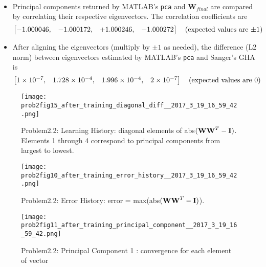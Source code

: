 \documentclass[epsfig]{article}
\begin{document}
\begin{itemize}
\begin{align*}
		\end{align*}
	\item  Principal components returned by MATLAB's \verb|pca| and  $\mathbf{W}_{final}$ are compared by correlating their respective eigenvectors.  The correlation coefficients are
		\begin{align*}
			\begin{bmatrix}
    				-1.000046, & -1.000172,  & +1.000246, & -1.000272 \\
			\end{bmatrix} \text{\quad (expected values are $\pm 1$) }\\
		\end{align*}
	\item After aligning the eigenvectors (multiply by $\pm 1$ as needed), the difference (L2 norm) between eigenvectors estimated by MATLAB's \verb|pca| and Sanger's GHA is
		\begin{align*}
			\begin{bmatrix}
    				1 \times 10^{-7}, &    1.728 \times 10^{-4},  &  1.996 \times 10^{-4},   &  2 \times 10^{-7}  \\
			\end{bmatrix} \text{\quad (expected values are 0) }\\
		\end{align*}
\end{itemize}
\newpage
\begin{figure}[h!]
\caption{Problem2.2: Learning History: diagonal elements of abs$({\bf WW}^T - {\bf I})$. Elements 1 through 4  correspond to principal components from largest to lowest. }
\texttt{[image: prob2fig15\_after\_training\_diagonal\_diff\_\_2017\_3\_19\_16\_59\_42.png]}
\end{figure}

\begin{figure}[h!]
\caption{Problem2.2: Error History: error = max(abs$({\bf WW}^T - {\bf I})$).}
\texttt{[image: prob2fig10\_after\_training\_error\_history\_\_2017\_3\_19\_16\_59\_42.png]}
\end{figure}

\begin{figure}[h!]
\caption{Problem2.2: Principal Component 1 : convergence for each element of vector}
\texttt{[image: prob2fig11\_after\_training\_principal\_component\_\_2017\_3\_19\_16\_59\_42.png]}
\end{figure}
\end{document}
